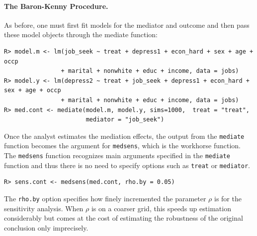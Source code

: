 \documentclass[11pt,letterpaper]{article}
\theoremstyle{plain}
\begin{document}
\paragraph{The Baron-Kenny Procedure.}
As before, one must first fit models for the mediator and outcome and then pass these model objects through the mediate function:
\begin{verbatim}
R> model.m <- lm(job_seek ~ treat + depress1 + econ_hard + sex + age + occp 
                + marital + nonwhite + educ + income, data = jobs)
R> model.y <- lm(depress2 ~ treat + job_seek + depress1 + econ_hard + sex + age + occp
                + marital + nonwhite + educ + income, data = jobs)
R> med.cont <- mediate(model.m, model.y, sims=1000,  treat = "treat",
                       mediator = "job_seek")
\end{verbatim}

Once the analyst estimates the mediation effects, the output from the
{\tt mediate} function becomes the argument for \texttt{medsens},
which is the workhorse function. The {\tt medsens} function
recognizes main arguments specified in the {\tt mediate} function and
thus there is no need to specify options such as \texttt{treat} or 
\texttt{mediator}.
\begin{verbatim}
R> sens.cont <- medsens(med.cont, rho.by = 0.05)
\end{verbatim}
The \texttt{rho.by} option specifies how finely incremented the parameter $\rho$
is for the sensitivity analysis. When $\rho$ is on a coarser grid, this speeds
up estimation considerably but comes at the cost of estimating the
robustness of the original conclusion only imprecisely.
\end{document}
